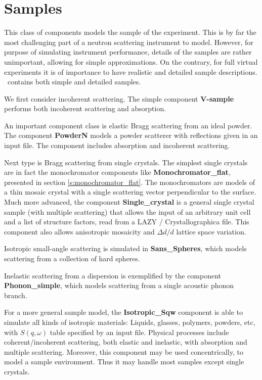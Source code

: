 \chapter{Samples}
\label{c:samples}

This class of components models the sample of the experiment.
This is by far the most challenging part of a neutron scattering
instrument to model. However, for purpose of simulating
instrument performance, details of the samples are rather unimportant,
allowing for simple approximations. On the contrary, for full
virtual experiments it is of importance to have realistic and
detailed sample descriptions. \MCS\ contains both simple and detailed
samples.

We first consider incoherent scattering. The simple component {\bf V-sample}
performs both incoherent scattering and absorption.

An important component class is elastic Bragg scattering from an ideal powder.
The component {\bf PowderN} models a powder scatterer with reflections
given in an input file.
The component includes absorption and incoherent scattering.

Next type is Bragg scattering from single crystals.
The simplest single crystals are in fact the monochromator components
like {\bf Monochromator\_flat}, presented in section \ref{s:monochromator_flat}.
The monochromators are models of a thin mosaic crystal
with a single scattering vector perpendicular to the surface.
Much more advanced, the component {\bf Single\_crystal}
is a general single crystal sample (with multiple scattering) that allows
the input of an arbitrary unit cell and a list of structure factors, read
from a LAZY / Crystallographica file.
This component also allows anisotropic mosaicity
and $\Delta d/d$ lattice space variation.

Isotropic small-angle scattering is simulated in {\bf Sans\_Spheres},
which models scattering from a collection of hard spheres.

Inelastic scattering from a dispersion is exemplified by
the component {\bf Phonon\_simple}, which models
scattering from a single acoustic phonon branch.

For a more general sample model, the {\bf Isotropic\_Sqw} component
is able to simulate all kinds of isotropic materials:
Liquids, glasses, polymers, powders, etc, with $S(q,\omega)$ table
specified by an input file.
Physical processes include coherent/incoherent scattering,
both elastic and inelastic, with absorption and multiple scattering.
Moreover, this component may be used concentrically,
to model a sample environment.
Thus it may handle most samples except single crystals.

